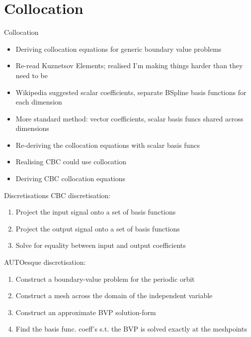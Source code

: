 \documentclass[presentation]{beamer}
\begin{document}
\section{Collocation}
\label{sec:orgd0cd04a}
\begin{frame}[label={sec:org13628d2}]{Collocation}
\begin{itemize}
\item Deriving collocation equations for generic boundary value problems
\end{itemize}
\vfill
\begin{itemize}
\item Re-read Kuznetsov Elements; realised I'm making things harder than they need to be
\item Wikipedia suggested scalar coefficients, separate BSpline basis functions for each dimension
\item More standard method: vector coefficients, scalar basis funcs shared across dimensions
\end{itemize}
\vfill
\begin{itemize}
\item Re-deriving the collocation equations with scalar basis funcs
\end{itemize}
\vfill
\begin{itemize}
\item Realising CBC could use collocation
\item Deriving CBC collocation equations
\end{itemize}
\end{frame}

\begin{frame}[label={sec:orgf13b50f}]{Discretisations}
CBC discretisation:
\begin{enumerate}
\item Project the input signal onto a set of basis functions
\item Project the output signal onto a set of basis functions
\item Solve for equality between input and output coefficients
\end{enumerate}
\vfill
AUTOesque discretisation:
\begin{enumerate}
\item Construct a boundary-value problem for the periodic orbit
\item Construct a mesh across the domain of the independent variable
\item Construct an approximate BVP solution-form
\item Find the basis func. coeff's s.t. the BVP is solved exactly at the meshpoints
\end{enumerate}
\end{frame}
\end{document}
